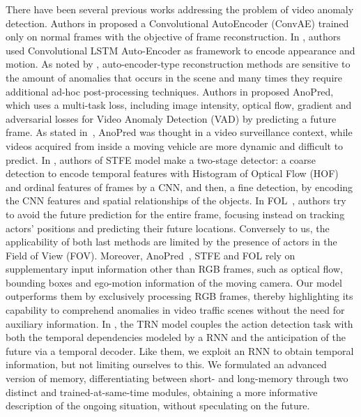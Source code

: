 There have been several previous works addressing the problem of video anomaly detection.
Authors in \cite{hasan2016learning} proposed a Convolutional AutoEncoder (ConvAE) trained only on normal frames with the objective of frame reconstruction.
In \cite{luo2017remembering,wang2018abnormal}, authors used Convolutional LSTM Auto-Encoder as framework to encode appearance and motion.
As noted by \cite{ramachandra2020survey}, auto-encoder-type reconstruction methods are sensitive to the amount of anomalies that occurs in the scene and many times they require additional ad-hoc post-processing techniques.
Authors in \cite{liu2018future} proposed AnoPred, which uses a multi-task loss, including image intensity, optical flow, gradient and adversarial losses for Video Anomaly Detection (VAD) by predicting a future frame.
As stated in~\cite{9712446}, AnoPred was thought in a video surveillance context, while videos acquired from inside a moving vehicle are more dynamic and difficult to predict.
In \cite{zhou_spatio-temporal_2022}, authors of STFE model make a two-stage detector: a coarse detection to encode temporal features with Histogram of Optical Flow (HOF) \cite{wang2013action} and ordinal features of frames by a CNN, and then, a fine detection, by encoding the CNN features and spatial relationships of the objects.
In FOL~\cite{9712446}, authors try to avoid the future prediction for the entire frame, focusing instead on tracking actors' positions and predicting their future locations.
Conversely to us, the applicability of both last methods are limited by the presence of actors in the Field of View (FOV).
Moreover, AnoPred~\cite{liu2018future}, STFE \cite{zhou_spatio-temporal_2022} and FOL \cite{9712446} rely on supplementary input information other than RGB frames, such as optical flow, bounding boxes and ego-motion information of the moving camera.
Our model outperforms them by exclusively processing RGB frames, thereby highlighting its capability to comprehend anomalies in video traffic scenes without the need for auxiliary information.
In \cite{xu2019temporal}, the TRN model couples the action detection task with both the temporal dependencies modeled by a RNN and the anticipation of the future via a temporal decoder.
Like them, we exploit an RNN to obtain temporal information, but not limiting ourselves to this.
We formulated an advanced version of memory, differentiating between short- and long-memory through two distinct and trained-at-same-time modules, obtaining a more informative description of the ongoing situation, without speculating on the future.
